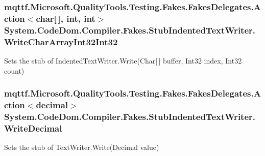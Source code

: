 \hypertarget{class_system_1_1_code_dom_1_1_compiler_1_1_fakes_1_1_stub_indented_text_writer_a44674269df7a28939e1d2d43371c0231}{
\subsubsection[{Write\-Char\-Array\-Int32\-Int32}]{\setlength{\rightskip}{0pt plus 5cm}mqttf.\-Microsoft.\-Quality\-Tools.\-Testing.\-Fakes.\-Fakes\-Delegates.\-Action$<$char\mbox{[}$\,$\mbox{]}, int, int$>$ System.\-Code\-Dom.\-Compiler.\-Fakes.\-Stub\-Indented\-Text\-Writer.\-Write\-Char\-Array\-Int32\-Int32}}\label{class_system_1_1_code_dom_1_1_compiler_1_1_fakes_1_1_stub_indented_text_writer_a44674269df7a28939e1d2d43371c0231}


Sets the stub of Indented\-Text\-Writer.\-Write(\-Char\mbox{[}$\,$\mbox{]} buffer, Int32 index, Int32 count)

\hypertarget{class_system_1_1_code_dom_1_1_compiler_1_1_fakes_1_1_stub_indented_text_writer_abfe9da42f55c26486c9885e2c6ed46ee}{
\subsubsection[{Write\-Decimal}]{\setlength{\rightskip}{0pt plus 5cm}mqttf.\-Microsoft.\-Quality\-Tools.\-Testing.\-Fakes.\-Fakes\-Delegates.\-Action$<$decimal$>$ System.\-Code\-Dom.\-Compiler.\-Fakes.\-Stub\-Indented\-Text\-Writer.\-Write\-Decimal}}\label{class_system_1_1_code_dom_1_1_compiler_1_1_fakes_1_1_stub_indented_text_writer_abfe9da42f55c26486c9885e2c6ed46ee}


Sets the stub of Text\-Writer.\-Write(\-Decimal value)


